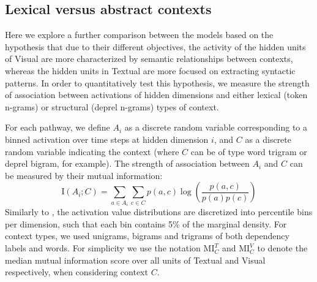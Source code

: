 %
%
%
%
\subsection{Lexical versus abstract contexts}
\label{seq:describe}

Here we explore a further comparison between the
models based on the hypothesis that due to their different objectives,
the activity of the hidden units of {\sc Visual} are more
characterized by semantic relationships between contexts, whereas the
hidden units in {\sc Textual} are more focused on extracting syntactic
patterns. In order to quantitatively test this hypothesis, we measure the strength
of association between activations of hidden dimensions and either lexical
(token n-grams) or structural (deprel n-grams) types of context.

For each pathway, we define $A_i$ as a discrete random variable corresponding 
to a binned activation over time steps at hidden dimension $i$, and $C$ 
as a discrete random variable indicating the context 
(where $C$ can be of type word trigram or deprel bigram, for example). 
The strength of association between $A_i$ and $C$ can be measured 
by their mutual information:
\[
\mathrm{I}(A_i;C) = \sum_{a\in{A_i}}\sum_{c\in{C}} p(a,c)\log\left(\frac{p(a,c)}{p(a)p(c)}\right) 
\]
Similarly to , the activation value distributions are discretized 
into percentile bins per dimension, such that each bin contains 5\% of the marginal 
density. For context types, we used unigrams, bigrams and trigrams of both dependency labels 
and words. For simplicity we use the notation $\mathrm{MI}^T_C$ and  $\mathrm{MI}^V_C$ 
to denote the median mutual information score over all units of {\sc Textual} and {\sc Visual} 
respectively, when considering context $C$. 

